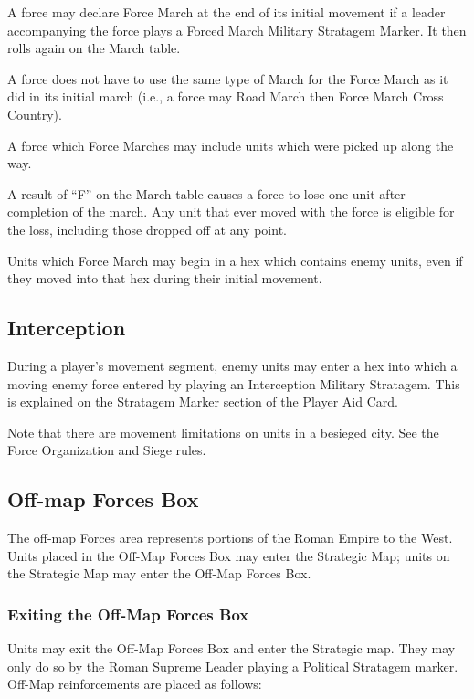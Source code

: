 A force may declare Force March at the end of its initial movement if a leader accompanying the force plays a Forced March Military Stratagem Marker. It then rolls again on the March table.

A force does not have to use the same type of March for the Force March as it did in its initial march (i.e., a force may Road March then Force March Cross Country).

A force which Force Marches may include units which were picked up along the way.

A result of “F” on the March table causes a force to lose one unit after completion of the march. Any unit that ever moved with the force is eligible for the loss, including those dropped off at any point.

Units which Force March may begin in a hex which contains enemy units, even if they moved into that hex during their initial movement.

\subsection{Interception}

During a player's movement segment, enemy units may enter a hex into which a moving enemy force entered by playing an Interception Military Stratagem. This is explained on the Stratagem Marker section of the Player Aid Card.

Note that there are movement limitations on units in a besieged city. See the Force Organization and Siege rules.

\subsection{Off-map Forces Box}

The off-map Forces area represents portions of the Roman Empire to the West. Units placed in the Off-Map Forces Box may enter the Strategic Map; units on the Strategic Map may enter the Off-Map Forces Box.

\subsubsection{Exiting the Off-Map Forces Box}

Units may exit the Off-Map Forces Box and enter the Strategic map. They may only do so by the Roman Supreme Leader playing a Political Stratagem marker. Off-Map reinforcements are placed as follows:

